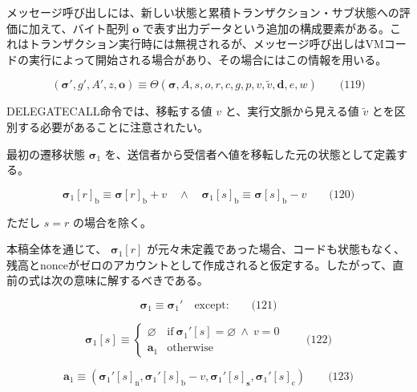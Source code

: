 \documentclass[
]{ltjsarticle}
\begin{document}
メッセージ呼び出しには、新しい状態と累積トランザクション・サブ状態への評価に加えて、バイト配列
\(\mathbf{o}\)
で表す出力データという追加の構成要素がある。これはトランザクション実行時には無視されるが、メッセージ呼び出しはVMコードの実行によって開始される場合があり、その場合にはこの情報を用いる。

\protect\hypertarget{eq-119}{}{}

\[(\boldsymbol{\sigma}', g', A', z, \mathbf{o}) \equiv {\Theta}(\boldsymbol{\sigma}, A, s, o, r, c, g, p, v, \tilde{v}, \mathbf{d}, e, w) \qquad \text{(119)}\]

DELEGATECALL命令では、移転する値 \(v\) と、実行文脈から見える値
\(\tilde{v}\) とを区別する必要があることに注意されたい。

最初の遷移状態 \(\boldsymbol{\sigma}_1\)
を、送信者から受信者へ値を移転した元の状態として定義する。

\protect\hypertarget{eq-120}{}{}

\[\boldsymbol{\sigma}_1[r]_{\mathrm{b}} \equiv \boldsymbol{\sigma}[r]_{\mathrm{b}} + v \quad\wedge\quad \boldsymbol{\sigma}_1[s]_{\mathrm{b}} \equiv \boldsymbol{\sigma}[s]_{\mathrm{b}} - v \qquad \text{(120)}\]

ただし \(s = r\) の場合を除く。

本稿全体を通じて、 \(\boldsymbol{\sigma}_1[r]\)
が元々未定義であった場合、コードも状態もなく、残高とnonceがゼロのアカウントとして作成されると仮定する。したがって、直前の式は次の意味に解するべきである。

\protect\hypertarget{eq-121}{}{}

\[\boldsymbol{\sigma}_1 \equiv \boldsymbol{\sigma}_1' \quad \text{except:} \qquad \text{(121)}\]

\protect\hypertarget{eq-122}{}{}

\[\boldsymbol{\sigma}_1[s] \equiv \begin{cases}
\varnothing & \text{if}\ \boldsymbol{\sigma}_1'[s] = \varnothing \ \wedge\ v = 0 \\
\mathbf{a}_1 &\text{otherwise}
\end{cases} \qquad \text{(122)}\]

\protect\hypertarget{eq-123}{}{}

\[\mathbf{a}_1 \equiv \left(\boldsymbol{\sigma}_1'[s]_{\mathrm{n}}, \boldsymbol{\sigma}_1'[s]_{\mathrm{b}} - v, \boldsymbol{\sigma}_1'[s]_{\mathbf{s}}, \boldsymbol{\sigma}_1'[s]_{\mathrm{c}}\right) \qquad \text{(123)}\]

\protect\hypertarget{eq-124}{}{}
\end{document}
